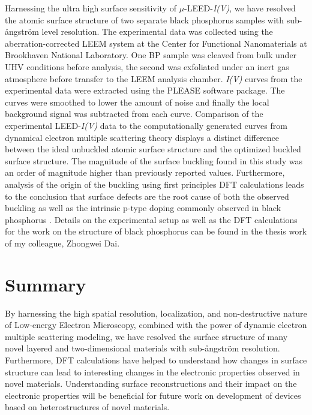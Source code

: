 Harnessing the ultra high surface sensitivity of $\mu$-LEED-\textit{I(V)}, we have resolved the atomic surface structure of two separate black phosphorus samples with sub-{\aa}ngstr\"{o}m level resolution. The experimental data was collected using the aberration-corrected LEEM system at the Center for Functional Nanomaterials at Brookhaven National Laboratory. One BP sample was cleaved from bulk under UHV conditions before analysis, the second was exfoliated under an inert gas atmosphere before transfer to the LEEM analysis chamber. \textit{I(V)} curves from the experimental data were extracted using the PLEASE software package. The curves were smoothed to lower the amount of noise and finally the local background signal was subtracted from each curve. Comparison of the experimental LEED-\textit{I(V)} data to the computationally generated curves from dynamical electron multiple scattering theory displays a distinct difference between the ideal unbuckled atomic surface structure and the optimized buckled surface structure. The magnitude of the surface buckling found in this study was an order of magnitude higher than previously reported values. Furthermore, analysis of the origin of the buckling using first principles DFT calculations leads to the conclusion that surface defects are the root cause of both the observed buckling as well as the intrinsic p-type doping commonly observed in black phosphorus \cite{rediscovering-BP}. Details on the experimental setup as well as the DFT calculations for the work on the structure of black phosphorus can be found in the thesis work of my colleague, Zhongwei Dai.

\section{Summary}
By harnessing the high spatial resolution, localization, and non-destructive nature of Low-energy Electron Microscopy, combined with the power of dynamic electron multiple scattering modeling, we have resolved the surface structure of many novel layered and two-dimensional materials with sub-{\aa}ngstr\"{o}m resolution. Furthermore, DFT calculations have helped to understand how changes in surface structure can lead to interesting changes in the electronic properties observed in novel materials. Understanding surface reconstructions and their impact on the electronic properties will be beneficial for future work on development of devices based on heterostructures of novel materials.
